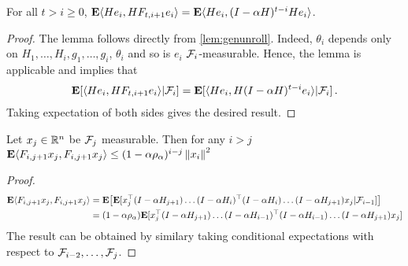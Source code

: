 \begin{lemma}\label{unroll}
For all $t>i\ge 0$, $\mathbf{E} \langle He_i,H F_{t,i+1} e_i\rangle=\mathbf{E}\langle He_i,(I-\alpha H)^{t-i}H e_i\rangle$.
\end{lemma}
\begin{proof}
The lemma follows directly from \cref{lem:genunroll}. Indeed, 
$\theta_i$ depends only on $H_1,\dots,H_{i},g_1,\dots,g_{i}$, $\theta_i$ and so is $e_i$ $\mathcal{F}_i$-measurable.
Hence, the lemma is applicable and implies that
\begin{align*}
\mathbf{E}[ \langle He_i, HF_{t,i+1} e_i\rangle | \mathcal{F}_i ] = 
\mathbf{E}[ \langle He_i, H (I-\alpha H)^{t-i} e_i\rangle | \mathcal{F}_i ]\,.
\end{align*}
Taking expectation of both sides gives the desired result.
\end{proof}

\begin{lemma}\label{innerproduct}
Let $x_j\in \mathbb{R}^n$ be $\mathcal{F}_j$ measurable. Then for any $i>j$ $\mathbf{E}\langle F_{i,j+1}x_j,F_{i,j+1}x_j\rangle\leq (1-\alpha \rho_\alpha)^{i-j}\left\| x_i\right\|^2$
\end{lemma}
\begin{proof}
\begin{align*}
\mathbf{E}\langle F_{i,j+1}x_j,F_{i,j+1}x_j\rangle&= \mathbf{E}\big[\mathbf{E}[x_j^\top (I-\alpha H_{j+1})\ldots (I-\alpha H_i)^\top (I-\alpha H_i)\ldots (I-\alpha H_{j+1})x_j|\mathcal{F}_{i-1}]\big]\\
&=(1-\alpha\rho_{\alpha}) \mathbf{E}[x_j^\top (I-\alpha H_{j+1})\ldots (I-\alpha H_{i-1})^\top (I-\alpha H_{i-1})\ldots (I-\alpha H_{j+1})x_j]
\end{align*}
The result can be obtained by similary taking conditional expectations with respect to $\mathcal{F}_{i-2},\ldots,\mathcal{F}_{j}$.
\end{proof}

